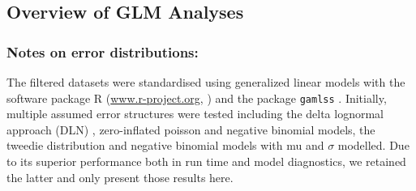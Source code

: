                                                                                        
                                                                                       
   \subsection{Overview of GLM Analyses}
   \subsubsection{Notes on error distributions:} 
  
   The  filtered datasets  were standardised using generalized linear models \citep{McCullagh1989_a} with the software package R (\url{www.r-project.org}, \citealt{RCT2013_a}) and the package \texttt{gamlss} \citep{Rigby2005_a}. Initially, multiple assumed error structures were tested including the delta lognormal approach (DLN)   \cite{Lo1992_a, Dick2006_a, Stefansson1996_a}, zero-inflated poisson and negative binomial models, the tweedie distribution \citep{Shono2008_a} and negative binomial models with mu and  $\sigma$ modelled. Due to its superior performance both in run time and model diagnostics, we retained the latter and only present those results here.

